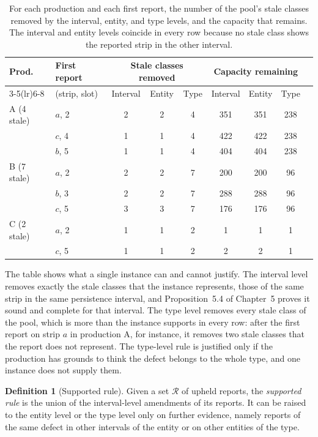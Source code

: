 \documentclass[11pt,twoside,openright]{book}
\theoremstyle{plain}
\theoremstyle{definition}
\newtheorem{definition}[theorem]{Definition}
\theoremstyle{remark}
\begin{document}
\begin{table}[ht]
\centering
\begin{tabular}{@{}llccccccc@{}}
\toprule
Prod. & First report & \multicolumn{3}{c}{Stale classes removed} & \multicolumn{3}{c}{Capacity remaining}\\
\cmidrule(lr){3-5}\cmidrule(lr){6-8}
 & (strip, slot) & Interval & Entity & Type & Interval & Entity & Type\\
\midrule
A (4 stale) & $a$, 2 & 2 & 2 & 4 & 351 & 351 & 238\\
 & $c$, 4 & 1 & 1 & 4 & 422 & 422 & 238\\
 & $b$, 5 & 1 & 1 & 4 & 404 & 404 & 238\\
B (7 stale) & $a$, 2 & 2 & 2 & 7 & 200 & 200 & 96\\
 & $b$, 3 & 2 & 2 & 7 & 288 & 288 & 96\\
 & $c$, 5 & 3 & 3 & 7 & 176 & 176 & 96\\
C (2 stale) & $a$, 2 & 1 & 1 & 2 & 1 & 1 & 1\\
 & $c$, 5 & 1 & 1 & 2 & 2 & 2 & 1\\
\bottomrule
\end{tabular}
\caption{For each production and each first report, the number of the pool's stale classes removed by the interval, entity, and type levels, and the capacity that remains. The interval and entity levels coincide in every row because no stale class shows the reported strip in the other interval.}\label{tab:cover}
\end{table}

The table shows what a single instance can and cannot justify. The interval level removes exactly the stale classes that the instance represents, those of the same strip in the same persistence interval, and Proposition~5.4 of Chapter~5 proves it sound and complete for that interval. The type level removes every stale class of the pool, which is more than the instance supports in every row: after the first report on strip $a$ in production A, for instance, it removes two stale classes that the report does not represent. The type-level rule is justified only if the production has grounds to think the defect belongs to the whole type, and one instance does not supply them.

\begin{definition}[Supported rule]\label{def:supported}
Given a set $\mathcal R$ of upheld reports, the \emph{supported rule} is the union of the interval-level amendments of its reports. It can be raised to the entity level or the type level only on further evidence, namely reports of the same defect in other intervals of the entity or on other entities of the type.
\end{definition}
\end{document}
